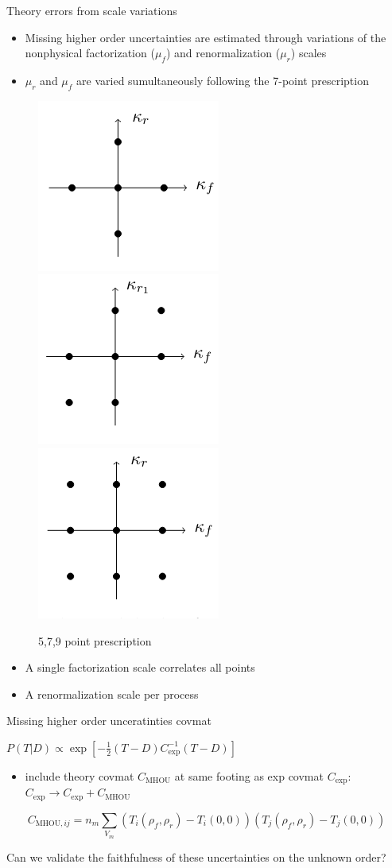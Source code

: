 \documentclass[aspectratio=169, 9pt,t]{beamer}
\begin{document}
\begin{frame}{Theory errors from scale variations}
  \begin{itemize}
    \item Missing higher order uncertainties are estimated through variations of the nonphysical factorization ($\mu_f$) and renormalization ($\mu_r$) scales
    \item $\mu_r$ and $\mu_f$ are varied sumultaneously following the 7-point prescription
  \end{itemize}
  \begin{figure}
    \includegraphics[width=.2\textwidth]{figures/5point.png}
    \includegraphics[width=.2\textwidth]{figures/7point.png}
    \includegraphics[width=.2\textwidth]{figures/9point.png}
    \caption*{5,7,9 point prescription}
  \end{figure}
  \begin{itemize}
    \item A single factorization scale correlates all points
    \item A renormalization scale per process
  \end{itemize}
\end{frame}

\begin{frame}{Missing higher order unceratinties covmat}

  $P(T|D) \propto \exp\left[-\frac{1}{2}\left(T-D\right)C_\mathrm{exp}^{-1}\left(T-D\right)\right]$
  \begin{itemize}
    \item include theory covmat $C_\mathrm{MHOU}$ at same footing as exp covmat $C_\mathrm{exp}$: $C_\mathrm{exp}\rightarrow C_\mathrm{exp}+C_\mathrm{MHOU}$
  \end{itemize}
  $$C_{\mathrm{MHOU},ij} = n_{m}\sum_{V_{m}}\left(T_{i}(\rho_f, \rho_r) - T_{i}(0, 0)\right)\left(T_{j}(\rho_f, \rho_r) - T_{j}(0, 0)\right)$$

  Can we validate the faithfulness of these uncertainties on the unknown order?

\end{frame}
\end{document}
